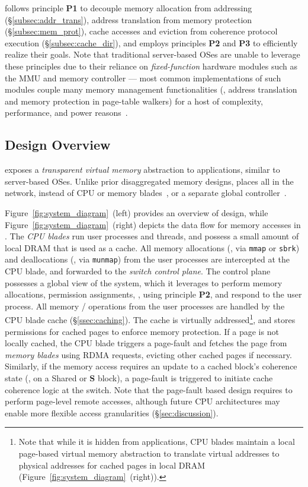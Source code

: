\vspace{0.075in}\noindent

\mind follows principle \textbf{P1} to decouple memory allocation from addressing (\S\ref{subsec:addr_trans}), address translation from memory protection (\S\ref{subsec:mem_prot}),  cache accesses and eviction from coherence protocol execution (\S\ref{subsec:cache_dir}),  and employs principles \textbf{P2} and \textbf{P3} to efficiently realize their goals. Note that traditional server-based OSes are unable to leverage these principles due to  their reliance on \textit{fixed-function} hardware modules such as the MMU and memory controller --- most common implementations of such modules couple many memory management functionalities (\eg, address translation and memory protection in page-table walkers) for a host of complexity, performance, and power reasons~\cite{vmbook, seesaw, rmmlite}.

\subsection{Design Overview}
\label{ssec:design}

\mind exposes a \textit{transparent virtual memory} abstraction to applications, similar to server-based OSes. Unlike prior disaggregated memory designs, \mind places all \mmm in the network, instead of CPU or memory blades~\cite{infiniswap, fastswap}, or a separate global controller~\cite{legoos}. 

Figure~\ref{fig:system_diagram}~(left) provides an overview of \mind design, while Figure~\ref{fig:system_diagram}~(right) depicts the data flow for memory accesses in \mind. The \textit{CPU blades} run user processes and threads, and possess a small amount of local DRAM that is used as a cache. All memory allocations (\eg, via \texttt{mmap} or \texttt{sbrk}) and deallocations (\eg, via \texttt{munmap}) from the user processes are intercepted at the CPU blade, and forwarded to the \textit{switch control plane}. The control plane possesses a global view of the system, which it leverages to perform memory allocations, permission assignments, \etc, using principle \textbf{P2}, and respond to the user process. All memory / operations from the user processes are handled by the CPU blade cache (\S\ref{ssec:caching}). The cache is virtually addressed\footnote{Note that while it is hidden from applications, CPU blades maintain a local page-based virtual memory abstraction to translate \mind virtual addresses to physical addresses for cached pages in local DRAM (Figure~\ref{fig:system_diagram}~(right)).}, and stores permissions for cached pages to enforce memory protection. If a page is not locally cached, the CPU blade triggers a page-fault and fetches the page from \textit{memory blades} using RDMA requests, evicting other cached pages if necessary. Similarly, if the memory access requires an update to a cached block's coherence state (\eg,  on a Shared or \textbf{S} block), a page-fault is triggered to initiate cache coherence logic at the switch. Note that the page-fault based design requires \mind to perform page-level remote accesses, although future CPU architectures may enable more flexible access granularities (\S\ref{sec:discussion}).

